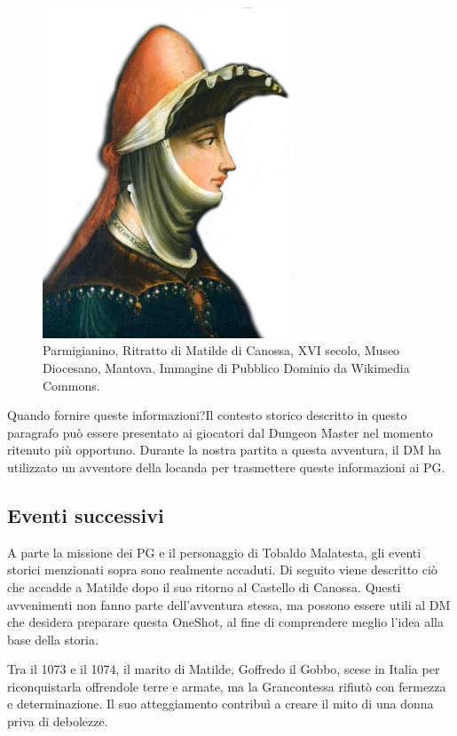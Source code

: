 \documentclass[letterpaper,twocolumn,openany,nodeprecatedcode]{dndbook}
\begin{document}
\begin{figure}
\centering
\includegraphics[width=7.5cm]{img/matilde.png}
    \caption{\textsf{Parmigianino, Ritratto di Matilde di Canossa, XVI secolo, Museo Diocesano, Mantova. Immagine di Pubblico Dominio da Wikimedia Commons.}}
    \label{fig:matilde}
\end{figure}

\begin{DndSidebar}{Quando fornire queste informazioni?}Il contesto storico descritto in questo paragrafo può essere presentato ai giocatori dal Dungeon Master nel momento ritenuto più opportuno. Durante la nostra partita a questa avventura, il DM ha utilizzato un avventore della locanda per trasmettere queste informazioni ai PG.
\end{DndSidebar}

\subsection{Eventi successivi}
A parte la missione dei PG e il personaggio di Tobaldo Malatesta, gli eventi storici menzionati sopra sono realmente accaduti. Di seguito viene descritto ciò che accadde a Matilde dopo il suo ritorno al Castello di Canossa. Questi avvenimenti non fanno parte dell'avventura stessa, ma possono essere utili al DM che desidera preparare questa OneShot, al fine di comprendere meglio l'idea alla base della storia.

Tra il 1073 e il 1074, il marito di Matilde, Goffredo il Gobbo, scese in Italia per riconquistarla offrendole terre e armate, ma la Grancontessa rifiutò con fermezza e determinazione. Il suo atteggiamento contribuì a creare il mito di una donna priva di debolezze.
\end{document}

